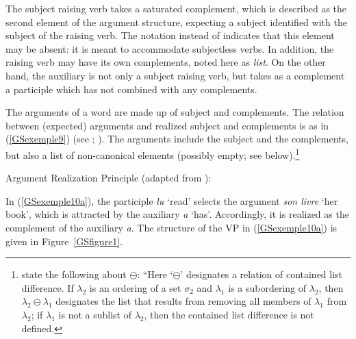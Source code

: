 \noindent
The subject raising verb takes a saturated complement, which is described as the second
element of the argument structure, expecting a subject  identified with the subject of the
raising verb. The notation  instead of  indicates that this element may be
absent: it is meant to accommodate subjectless verbs. In addition, the raising verb may have its own
complements, noted here as \emph{list}. On the other hand, the auxiliary is not only a subject raising
verb, but takes as a complement a participle which has not combined with any complements.

The arguments of a word are made up of subject and complements. The relation between (expected)
arguments and realized subject and complements is as in (\ref{GSexemple9}) (see
\citealt[171]{GSag2000a-u}; \citealt[]{BMS2001a}). The arguments include the subject
and  the complements, but also a list of non-canonical elements (possibly empty; see below).\footnote{\citet[]{GSag2000a-u} state the
  following about $\ominus$: ``Here `$\ominus$' designates a relation of contained list difference. If
$\lambda_2$ is an ordering of a set $\sigma_2$ and $\lambda_1$ is a subordering of $\lambda_2$, then
$\lambda_2 \ominus \lambda_1$ designates the list that results from removing all members of
$\lambda_1$ from $\lambda_2$; if $\lambda_1$ is not a sublist of $\lambda_2$, then the contained
list difference is not defined.}

\largerpage%
\ea
Argument Realization Principle (adapted from \citealt[171]{GSag2000a-u}):\\
 \impl
{}
\label{GSexemple9}
\z

In (\ref{GSexemple10a}), the participle \emph{lu} `read' selects the argument \emph{son livre} `her book', which is attracted by the auxiliary \emph{a} `has'. Accordingly, it is realized as the complement of the auxiliary \emph{a}. The structure of the VP in (\ref{GSexemple10a}) is given in Figure~\ref{GSfigure1}.

\eal
	\label{GSexemple10}
	\label{GSexemple10a}
		
